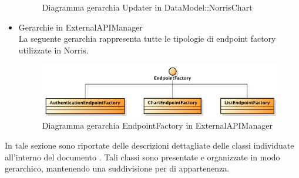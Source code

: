 \begin{itemize}
\begin{figure}[H]
	                \caption{Diagramma gerarchia Updater in DataModel::NorrisChart }
	            \end{figure}
			\item Gerarchie in ExternalAPIManager \\
				La seguente gerarchia rappresenta tutte le tipologie di endpoint factory utilizzate in Norris.
				\begin{figure}[H]
	                \centering
	                \includegraphics[width=1\textwidth]{DefinizioneDiProdotto/Pics/Gerarchie/NorrisEndpointFactory.pdf}
	                \caption{Diagramma gerarchia EndpointFactory in ExternalAPIManager}
	            \end{figure}

		\end{itemize}
    	In tale sezione sono riportate delle descrizioni dettagliate delle classi individuate all'interno del documento . Tali classi sono presentate e organizzate in modo gerarchico, mantenendo una suddivisione per  di appartenenza.
        
        

